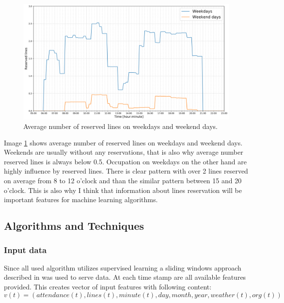 \documentclass{article}
\begin{document}
\begin{figure}[H]
\centering
\includegraphics[width=13cm]{imgs/avg_lines.png}
\caption{Average number of reserved lines on weekdays and weekend days.}
\label{fig:lines_averages}
\end{figure}

Image \ref{fig:lines_averages} shows average number of reserved lines on weekdays and weekend days. Weekends are usually without any reservations, that is also why average number reserved lines is always below 0.5. Occupation on weekdays on the other hand are highly influence by reserved lines. There is clear pattern with over 2 lines reserved on average from 8 to 12 o'clock and than the similar pattern between 15 and 20 o'clock. This is also why I think that information about lines reservation will be important features for machine learning algorithms.

\subsection{Algorithms and Techniques}
\subsubsection{Input data}
Since all used algorithm utilizes supervised learning a sliding windows approach described in \citep{brownlee2019howtosupervised} was used to serve data. At each time stamp are all available features provided. This creates vector of input features with following content:
\begin{equation}
\label{eq:input_vector}
v(t) = (attendance(t), lines(t), minute(t), day, month, year, weather(t), org(t))
\end{equation}
\end{document}
